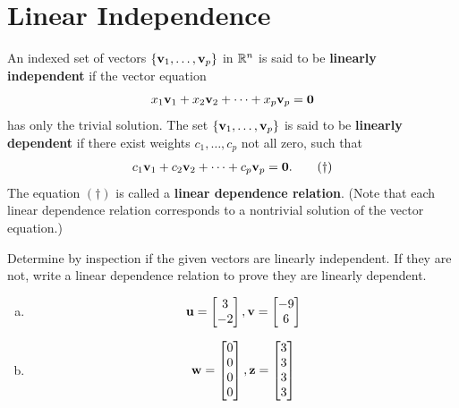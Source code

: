 \newpage


\section{Linear Independence}
\name

\begin{boxdef}
	An indexed set of vectors $\{\boldsymbol{\mathbf{v}}_1,\ldots,\boldsymbol{\mathbf{v}}_p\}$ in $\mathbb{R}^n$ is said to be \textbf{linearly independent} if the vector equation
	$$ x_1\boldsymbol{\mathbf{v}}_1 + x_2\boldsymbol{\mathbf{v}}_2 + \cdots + x_p\boldsymbol{\mathbf{v}}_p = \boldsymbol{\mathbf{0}} $$
	has only the trivial solution. The set $\{\boldsymbol{\mathbf{v}}_1,\ldots,\boldsymbol{\mathbf{v}}_p\}$ is said to be \textbf{linearly dependent} if there exist weights $c_1,\ldots,c_p$ not all zero, such that
	\begin{align*}
	c_1\boldsymbol{\mathbf{v}}_1 + c_2\boldsymbol{\mathbf{v}}_2 + \cdots + c_p\boldsymbol{\mathbf{v}}_p = \boldsymbol{\mathbf{0}}. \tag{\dag}
	\end{align*}
	The equation $(\dag)$ is called a \textbf{linear dependence relation}. (Note that each linear dependence relation corresponds to a nontrivial solution of the vector equation.)
\end{boxdef}

\begin{exercise} %
	Determine by inspection if the given vectors are linearly independent. If they are not, write a linear dependence relation to prove they are linearly dependent.
	\begin{multicols}{2}
		\begin{enumerate}[(a)]
			\item $$\boldsymbol{\mathbf{u}}=\begin{bmatrix}3\\-2\end{bmatrix}, \boldsymbol{\mathbf{v}}=\begin{bmatrix}-9\\6\end{bmatrix}$$
			\item $$\boldsymbol{\mathbf{w}}=\begin{bmatrix}0\\0\\0\\0\end{bmatrix}, \boldsymbol{\mathbf{z}}=\begin{bmatrix}3\\3\\3\\3\end{bmatrix}$$
		\end{enumerate}
	\end{multicols}
\end{exercise}
\vfill


